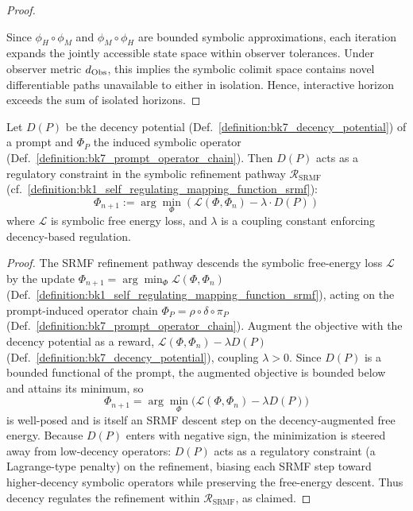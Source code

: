 \begin{proof}
\label{proof:bk7_symbolic_expansion}
\leavevmode

Since $\phi_H \circ \phi_M$ and $\phi_M \circ \phi_H$ are bounded symbolic approximations, each iteration expands the jointly accessible state space within observer tolerances. Under observer metric $d_{\mathrm{Obs}}$, this implies the symbolic colimit space contains novel differentiable paths unavailable to either in isolation. Hence, interactive horizon exceeds the sum of isolated horizons.
\end{proof}

\begin{proposition}
\label{proposition:bk7_srmf_decency_regulation}
Let $D(P)$ be the decency potential (Def.~\ref{definition:bk7_decency_potential}) of a prompt and $\Phi_P$ the induced symbolic operator (Def.~\ref{definition:bk7_prompt_operator_chain}). Then $D(P)$ acts as a regulatory constraint in the symbolic refinement pathway $\mathcal{R}_{\text{SRMF}}$ (cf.~\ref{definition:bk1_self_regulating_mapping_function_srmf}):
\[
\Phi_{n+1} := \arg\min_{\Phi} \left( \mathcal{L}(\Phi, \Phi_n) - \lambda \cdot D(P) \right)
\]
where $\mathcal{L}$ is symbolic free energy loss, and $\lambda$ is a coupling constant enforcing decency-based regulation.
\end{proposition}
\begin{proof}
\label{proof:bk7_srmf_decency_regulation}
\leavevmode
The SRMF refinement pathway descends the symbolic free-energy loss $\mathcal{L}$ by the update $\Phi_{n+1}=\arg\min_{\Phi}\mathcal{L}(\Phi,\Phi_n)$ (Def.~\ref{definition:bk1_self_regulating_mapping_function_srmf}), acting on the prompt-induced operator chain $\Phi_P=\rho\circ\delta\circ\pi_P$ (Def.~\ref{definition:bk7_prompt_operator_chain}). Augment the objective with the decency potential as a reward, $\mathcal{L}(\Phi,\Phi_n)-\lambda D(P)$ (Def.~\ref{definition:bk7_decency_potential}), coupling $\lambda>0$. Since $D(P)$ is a bounded functional of the prompt, the augmented objective is bounded below and attains its minimum, so
\[
\Phi_{n+1}=\arg\min_{\Phi}\big(\mathcal{L}(\Phi,\Phi_n)-\lambda D(P)\big)
\]
is well-posed and is itself an SRMF descent step on the decency-augmented free energy. Because $D(P)$ enters with negative sign, the minimization is steered away from low-decency operators: $D(P)$ acts as a regulatory constraint (a Lagrange-type penalty) on the refinement, biasing each SRMF step toward higher-decency symbolic operators while preserving the free-energy descent. Thus decency regulates the refinement within $\mathcal{R}_{\text{SRMF}}$, as claimed.
\end{proof}

